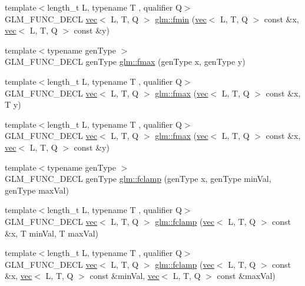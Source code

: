 \begin{DoxyCompactItemize}
\item 
{\footnotesize template$<$length\+\_\+t L, typename T , qualifier Q$>$ }\\G\+L\+M\+\_\+\+F\+U\+N\+C\+\_\+\+D\+E\+CL \hyperlink{structglm_1_1vec}{vec}$<$ L, T, Q $>$ \hyperlink{group__gtx__extended__min__max_ga7c42e93cd778c9181d1cdeea4d3e43bd}{glm\+::fmin} (\hyperlink{structglm_1_1vec}{vec}$<$ L, T, Q $>$ const \&x, \hyperlink{structglm_1_1vec}{vec}$<$ L, T, Q $>$ const \&y)
\item 
{\footnotesize template$<$typename gen\+Type $>$ }\\G\+L\+M\+\_\+\+F\+U\+N\+C\+\_\+\+D\+E\+CL gen\+Type \hyperlink{group__gtx__extended__min__max_gae5792cb2b51190057e4aea027eb56f81}{glm\+::fmax} (gen\+Type x, gen\+Type y)
\item 
{\footnotesize template$<$length\+\_\+t L, typename T , qualifier Q$>$ }\\G\+L\+M\+\_\+\+F\+U\+N\+C\+\_\+\+D\+E\+CL \hyperlink{structglm_1_1vec}{vec}$<$ L, T, Q $>$ \hyperlink{group__gtx__extended__min__max_gab380df808a15a6a23993e3475d1b94d2}{glm\+::fmax} (\hyperlink{structglm_1_1vec}{vec}$<$ L, T, Q $>$ const \&x, T y)
\item 
{\footnotesize template$<$length\+\_\+t L, typename T , qualifier Q$>$ }\\G\+L\+M\+\_\+\+F\+U\+N\+C\+\_\+\+D\+E\+CL \hyperlink{structglm_1_1vec}{vec}$<$ L, T, Q $>$ \hyperlink{group__gtx__extended__min__max_ga538c9e7de1d0cb8157e548691487d32a}{glm\+::fmax} (\hyperlink{structglm_1_1vec}{vec}$<$ L, T, Q $>$ const \&x, \hyperlink{structglm_1_1vec}{vec}$<$ L, T, Q $>$ const \&y)
\item 
{\footnotesize template$<$typename gen\+Type $>$ }\\G\+L\+M\+\_\+\+F\+U\+N\+C\+\_\+\+D\+E\+CL gen\+Type \hyperlink{group__gtx__extended__min__max_ga1e28539d3a46965ed9ef92ec7cb3b18a}{glm\+::fclamp} (gen\+Type x, gen\+Type min\+Val, gen\+Type max\+Val)
\item 
{\footnotesize template$<$length\+\_\+t L, typename T , qualifier Q$>$ }\\G\+L\+M\+\_\+\+F\+U\+N\+C\+\_\+\+D\+E\+CL \hyperlink{structglm_1_1vec}{vec}$<$ L, T, Q $>$ \hyperlink{group__gtx__extended__min__max_ga60796d08903489ee185373593bc16b9d}{glm\+::fclamp} (\hyperlink{structglm_1_1vec}{vec}$<$ L, T, Q $>$ const \&x, T min\+Val, T max\+Val)
\item 
{\footnotesize template$<$length\+\_\+t L, typename T , qualifier Q$>$ }\\G\+L\+M\+\_\+\+F\+U\+N\+C\+\_\+\+D\+E\+CL \hyperlink{structglm_1_1vec}{vec}$<$ L, T, Q $>$ \hyperlink{group__gtx__extended__min__max_ga5c15fa4709763c269c86c0b8b3aa2297}{glm\+::fclamp} (\hyperlink{structglm_1_1vec}{vec}$<$ L, T, Q $>$ const \&x, \hyperlink{structglm_1_1vec}{vec}$<$ L, T, Q $>$ const \&min\+Val, \hyperlink{structglm_1_1vec}{vec}$<$ L, T, Q $>$ const \&max\+Val)
\end{DoxyCompactItemize}


